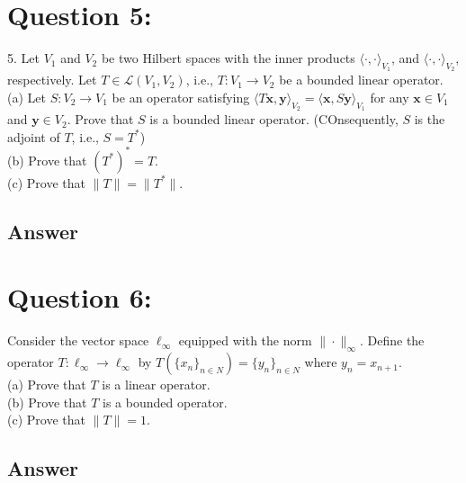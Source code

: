 \documentclass[a4paper,12pt]{article}
\begin{document}
\section*{Question 5:}
5. Let \(V_1\) and \(V_2\) be two Hilbert spaces with the inner products \(\langle \cdot, \cdot \rangle_{V_1}\), and \(\langle \cdot, \cdot\rangle_{V_2}\), respectively.
Let \(T \in \mathcal{L}(V_1, V_2)\), i.e., \(T: V_1 \to V_2\) be a bounded linear operator. \\
(a) Let \(S:V_2 \to V_1\) be an operator satisfying \(\langle T\bm{x}, \bm{y}\rangle_{V_2} = \langle \bm{x}, S\bm{y}\rangle_{V_1}\) for any \(\bm{x} \in V_1\) and \(\bm{y} \in V_2\).
Prove that \(S\) is a bounded linear operator. (COnsequently, \(S\) is the adjoint of \(T\), i.e., \(S = T^*\)) \\
(b) Prove that \((T^*)^* = T\). \\
(c) Prove that \(\|T\| = \|T^*\|\).


\subsection*{Answer}

\section*{Question 6:}
Consider the vector space \(\ell_{\infty}\) equipped with the norm \(\|\cdot\|_{\infty}\). Define the operator \(T: \ell_{\infty} \to \ell_{\infty}\) by \(T(\{x_n\}_{n \in N}) = \{y_n\}_{n\in N}\) where \(y_n = x_{n+1}\). \\
(a) Prove that \(T\) is a linear operator. \\
(b) Prove that \(T\) is a bounded operator. \\
(c) Prove that \(\|T\|=1\).

\subsection*{Answer}
\end{document}

